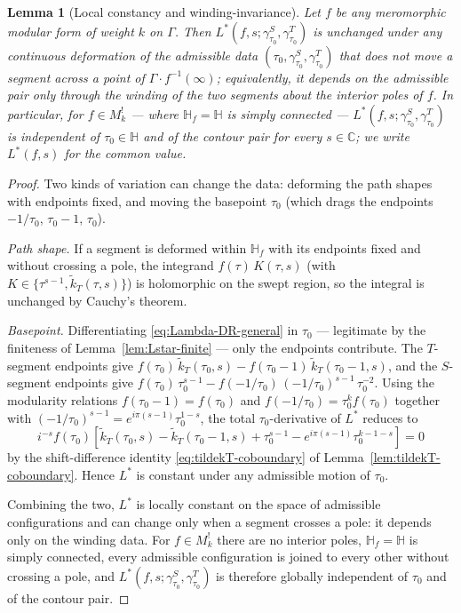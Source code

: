 \documentclass[11pt]{article}
\newtheorem{lemma}[theorem]{Lemma}
\numberwithin{equation}{section}  %
\newcommand{\HH}{\mathbb{H}}
\newcommand{\CC}{\mathbb{C}}
\begin{document}
\begin{lemma}[Local constancy and winding-invariance]\label{lem:Lstar-local-constancy}
Let $f$ be any meromorphic modular form of weight $k$ on $\Gamma$.
Then $L^*(f, s; \gamma^S_{\tau_0}, \gamma^T_{\tau_0})$ is unchanged
under any continuous deformation of the admissible data
$(\tau_0, \gamma^S_{\tau_0}, \gamma^T_{\tau_0})$ that does not move a
segment across a point of $\Gamma\!\cdot\! f^{-1}(\infty)$;
equivalently, it depends on the admissible pair only through the
winding of the two segments about the interior poles of $f$.  In
particular, for $f \in M^!_k$ --- where $\HH_f = \HH$ is simply
connected --- $L^*(f, s; \gamma^S_{\tau_0}, \gamma^T_{\tau_0})$ is
independent of $\tau_0 \in \HH$ and of the contour pair for every
$s \in \CC$; we write $L^*(f, s)$ for the common value.
\end{lemma}
\begin{proof}
Two kinds of variation can change the data: deforming the path shapes
with endpoints fixed, and moving the basepoint $\tau_0$ (which drags
the endpoints $-1/\tau_0$, $\tau_0 - 1$, $\tau_0$).

\emph{Path shape.}  If a segment is deformed within $\HH_f$ with its
endpoints fixed and without crossing a pole, the integrand
$f(\tau)\,K(\tau, s)$ (with $K \in \{\tau^{s-1}, \widetilde{k}_T(\tau, s)\}$)
is holomorphic on the swept region, so the integral is unchanged by
Cauchy's theorem.

\emph{Basepoint.}  Differentiating \eqref{eq:Lambda-DR-general} in
$\tau_0$ --- legitimate by the finiteness of
Lemma~\ref{lem:Lstar-finite} --- only the endpoints contribute.  The
$T$-segment endpoints give
$f(\tau_0)\,\widetilde{k}_T(\tau_0, s) - f(\tau_0 - 1)\,\widetilde{k}_T(\tau_0 - 1, s)$,
and the $S$-segment endpoints give
$f(\tau_0)\,\tau_0^{s-1} - f(-1/\tau_0)\,(-1/\tau_0)^{s-1}\,\tau_0^{-2}$.
Using the modularity relations $f(\tau_0 - 1) = f(\tau_0)$ and
$f(-1/\tau_0) = \tau_0^k f(\tau_0)$ together with
$(-1/\tau_0)^{s-1} = e^{i\pi(s-1)}\tau_0^{1-s}$, the total
$\tau_0$-derivative of $L^*$ reduces to
\begin{equation}
  i^{-s} f(\tau_0)\!\left[\widetilde{k}_T(\tau_0, s) - \widetilde{k}_T(\tau_0 - 1, s) + \tau_0^{s-1} - e^{i\pi(s-1)}\tau_0^{k-1-s}\right] = 0
\end{equation}
by the shift-difference identity \eqref{eq:tildekT-coboundary} of
Lemma~\ref{lem:tildekT-coboundary}.  Hence $L^*$ is constant under any
admissible motion of $\tau_0$.

Combining the two, $L^*$ is locally constant on the space of
admissible configurations and can change only when a segment crosses a
pole: it depends only on the winding data.  For $f \in M^!_k$ there
are no interior poles, $\HH_f = \HH$ is simply connected, every
admissible configuration is joined to every other without crossing a
pole, and $L^*(f, s; \gamma^S_{\tau_0}, \gamma^T_{\tau_0})$ is
therefore globally independent of $\tau_0$ and of the contour pair.
\end{proof}
\end{document}
